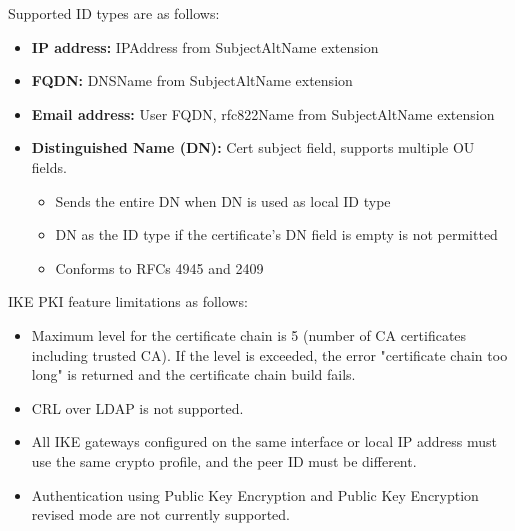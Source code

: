 Supported ID types are as follows:
\begin{itemize}
    \item \textbf{IP address:} IPAddress from SubjectAltName extension
    \item \textbf{FQDN:} DNSName from SubjectAltName extension
    \item \textbf{Email address:} User FQDN, rfc822Name from SubjectAltName extension
    \item \textbf{Distinguished Name (DN):} Cert subject field, supports multiple OU fields.
        \begin{itemize}
            \item Sends the entire DN when DN is used as local ID type
            \item DN as the ID type if the certificate's DN field is empty is not permitted
            \item Conforms to RFCs 4945 and 2409
        \end{itemize}
\end{itemize}
IKE PKI feature limitations as follows:
\begin{itemize}
    \item Maximum level for the certificate chain is 5 (number of CA certificates including trusted CA). If the level is exceeded, the error "certificate chain too long" is returned and the certificate chain build fails.
    \item CRL over LDAP is not supported.
    \item All IKE gateways configured on the same interface or local IP address must use the same crypto profile, and the peer ID must be different.
    \item Authentication using Public Key Encryption and Public Key Encryption revised mode are not currently supported.
\end{itemize}

